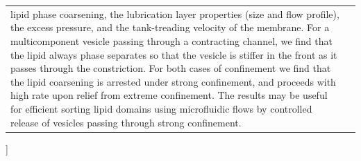 \documentclass[twoside,twocolumn,9pt]{article}
\begin{document}
\begin{@twocolumnfalse}
\begin{tabular}{m{4.5cm} p{13.5cm} }
{  lipid phase coarsening, the lubrication layer properties (size and
  flow profile), the excess pressure, and the tank-treading velocity of
  the membrane. For a multicomponent vesicle passing through a
  contracting channel, we find that the lipid always phase separates so
  that the vesicle is stiffer in the front as it passes through the
  constriction. For both cases of confinement we find that the lipid
  coarsening is arrested under strong confinement, and proceeds with
  high rate upon relief from extreme confinement. The results may be
  useful for efficient sorting lipid domains using microfluidic flows by
  controlled release of vesicles passing through strong confinement.} \\
%
\end{tabular}
%
 \end{@twocolumnfalse} \vspace{0.6cm}
]

\renewcommand*\rmdefault{bch}\normalfont\upshape
\rmfamily
\section*{}
\vspace{-1cm}





\end{document}
